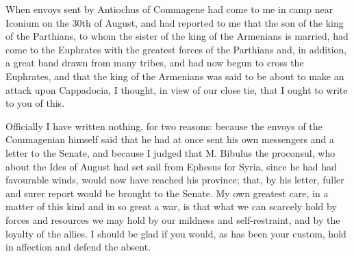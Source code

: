 

 When envoys sent by Antiochus of Commagene had come to me in camp near Iconium on the 30th of August, and had reported to me that the son of the king of the Parthians, to whom the sister of the king of the Armenians is married, had come to the Euphrates with the greatest forces of the Parthians and, in addition, a great band drawn from many tribes, and had now begun to cross the Euphrates, and that the king of the Armenians was said to be about to make an attack upon Cappadocia, I thought, in view of our close tie, that I ought to write to you of this.

 Officially I have written nothing, for two reasons: because the envoys of the Commagenian himself said that he had at once sent his own messengers and a letter to the Senate, and because I judged that M. Bibulus the proconsul, who about the Ides of August had set sail from Ephesus for Syria, since he had had favourable winds, would now have reached his province; that, by his letter, fuller and surer report would be brought to the Senate. My own greatest care, in a matter of this kind and in so great a war, is that what we can scarcely hold by forces and resources we may hold by our mildness and self-restraint, and by the loyalty of the allies. I should be glad if you would, as has been your custom, hold in affection and defend the absent.
